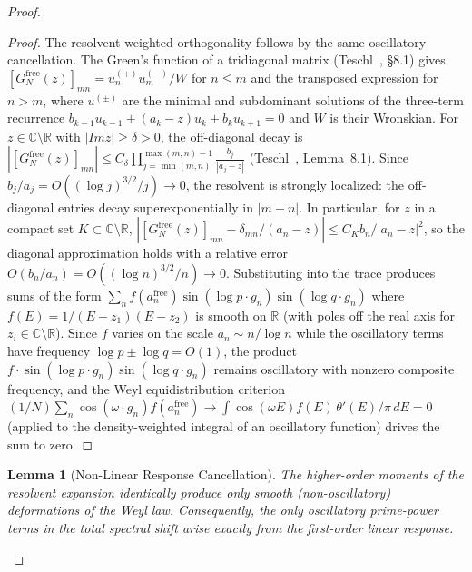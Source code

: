 \documentclass{pre-aomart}
\def\Im{Im}%
\theoremstyle{plain}
\newtheorem{lemma}[theorem]{Lemma}
\theoremstyle{definition}
\theoremstyle{remark}
\begin{document}
\begin{proof}
\begin{proof}
The resolvent-weighted orthogonality follows by the same oscillatory
cancellation.  The Green's function of a tridiagonal matrix
(Teschl~\cite{Teschl2000}, \S8.1) gives
$[G_N^{\mathrm{free}}(z)]_{mn} = u_n^{(+)}u_m^{(-)}/W$ for $n \le m$
and the transposed expression for $n > m$, where
$u^{(\pm)}$ are the minimal and subdominant solutions of the
three-term recurrence $b_{k-1}u_{k-1} + (a_k - z)u_k + b_k u_{k+1} = 0$
and $W$ is their Wronskian.  For $z \in \mathbb{C}\setminus\mathbb{R}$
with $|\Im z| \ge \delta > 0$, the off-diagonal decay is
$|[G_N^{\mathrm{free}}(z)]_{mn}| \le C_\delta \prod_{j=\min(m,n)}^{\max(m,n)-1}
\frac{b_j}{|a_j - z|}$
(Teschl~\cite{Teschl2000}, Lemma~8.1).
Since $b_j/a_j = O((\log j)^{3/2}/j) \to 0$, the resolvent is
strongly localized: the off-diagonal entries decay superexponentially
in $|m-n|$.  In particular, for $z$ in a compact set
$K \subset \mathbb{C}\setminus\mathbb{R}$,
$|[G_N^{\mathrm{free}}(z)]_{mn} - \delta_{mn}/(a_n-z)| \le C_K b_n/|a_n-z|^2$,
so the diagonal approximation holds with a relative error
$O(b_n/a_n) = O((\log n)^{3/2}/n) \to 0$.
Substituting into the trace produces sums of the form
$\sum_n f(a_n^{\mathrm{free}}) \sin(\log p\cdot g_n)\sin(\log q\cdot g_n)$
where $f(E) = 1/(E-z_1)(E-z_2)$ is smooth on $\mathbb{R}$
(with poles off the real axis for $z_i \in \mathbb{C}\setminus\mathbb{R}$).
Since $f$ varies on the scale $a_n \sim n/\log n$ while the
oscillatory terms have frequency $\log p \pm \log q = O(1)$,
the product $f \cdot \sin(\log p\cdot g_n)\sin(\log q\cdot g_n)$
remains oscillatory with nonzero composite frequency, and the
Weyl equidistribution criterion
$(1/N)\sum_n \cos(\omega \cdot g_n) f(a_n^{\mathrm{free}}) \to
\int \cos(\omega E) f(E)\,\theta'(E)/\pi\,dE = 0$
(applied to the density-weighted integral of an oscillatory function)
drives the sum to zero.
\end{proof}

\begin{lemma}[Non-Linear Response Cancellation]\label{lem:nonlinear_cancel}
The higher-order moments of the resolvent expansion identically produce only smooth (non-oscillatory) deformations of the Weyl law. Consequently, the only oscillatory prime-power terms in the total spectral shift arise exactly from the first-order linear response.
\end{lemma}


\end{proof}
\end{document}
